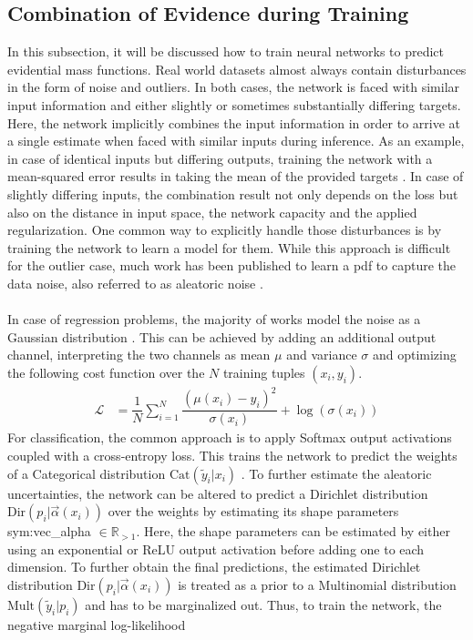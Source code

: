 \subsection{Combination of Evidence during Training}
\label{subsec:uncertainties_ev_theory}
In this subsection, it will be discussed how to train neural networks to predict evidential mass functions. Real world datasets almost always contain disturbances in the form of noise and outliers. In both cases, the network is faced with similar input information and either slightly or sometimes substantially differing targets. Here, the network implicitly combines the input information in order to arrive at a single estimate when faced with similar inputs during inference. As an example, in case of identical inputs but differing outputs, training the network with a mean-squared error results in taking the mean of the provided targets \cite{goodfellow2016deep}. In case of slightly differing inputs, the combination result not only depends on the loss but also on the distance in input space, the network capacity and the applied regularization. One common way to explicitly handle those disturbances is by training the network to learn a model for them. While this approach is difficult for the outlier case, much work has been published to learn a \gls{pdf} to capture the data noise, also referred to as aleatoric noise \cite{kendall2017uncertainties}.
\\\\
In case of regression problems, the majority of works model the noise as a Gaussian distribution \cite{yang2020d3vo,feng2019leveraging,kendall2017uncertainties}. This can be achieved by adding an additional output channel, interpreting the two channels as mean $\mu$ and variance $\sigma$ and optimizing the following cost function over the $N$ training tuples $(x_i,y_i)$.
\begin{align}
	\mathcal{L} &= \dfrac{1}{N}\sum_{i=1}^{N} \dfrac{(\mu(x_i) - y_i)^2}{\sigma(x_i)}+\log(\sigma(x_i))
\end{align}
For classification, the common approach is to apply Softmax output activations coupled with a cross-entropy loss. This trains the network to predict the weights of a Categorical distribution $\mathrm{Cat}(\tilde{y}_i|x_i)$ \cite{goodfellow2016deep}. To further estimate the aleatoric uncertainties, the network can be altered to predict a Dirichlet distribution $\mathrm{Dir}(p_i|\vec{\alpha}(x_i))$ over the weights by estimating its shape parameters \gls{sym:vec_alpha} $\in \mathbb{R}_{>1}$. Here, the shape parameters can be estimated by either using an exponential \cite{wu2019quantifying} or ReLU \cite{sensoy2018evidential} output activation before adding one to each dimension. To further obtain the final predictions, the estimated Dirichlet distribution $\mathrm{Dir}(p_i|\vec{\alpha}(x_i))$ is treated as a prior to a Multinomial distribution $\mathrm{Mult}(\tilde{y}_i|p_i)$ and has to be marginalized out. Thus, to train the network, the negative marginal log-likelihood 
